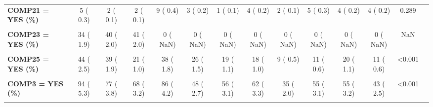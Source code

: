 \documentclass[
]{article}
\begin{document}
\begin{table}[H]
\begin{tabular}[t]{>{\raggedright\arraybackslash}p{5em}ccccccccccccc}
\textbf{COMP21 = YES (\%)} & 5 (  0.3) & 2 (  0.1) & 2 (  0.1) & 9 (  0.4) & 3 (  0.2) & 1 (  0.1) & 4 (  0.2) & 2 (  0.1) & 5 (  0.3) & 4 (  0.2) & 4 (  0.2) & 0.289 & \\
\textbf{\cellcolor{gray!10}{COMP22 = YES (\%)}} & \cellcolor{gray!10}{15 (  0.9)} & \cellcolor{gray!10}{16 (  0.8)} & \cellcolor{gray!10}{14 (  0.7)} & \cellcolor{gray!10}{12 (  0.6)} & \cellcolor{gray!10}{11 (  0.6)} & \cellcolor{gray!10}{9 (  0.5)} & \cellcolor{gray!10}{11 (  0.6)} & \cellcolor{gray!10}{9 (  0.5)} & \cellcolor{gray!10}{8 (  0.5)} & \cellcolor{gray!10}{6 (  0.3)} & \cellcolor{gray!10}{6 (  0.3)} & \cellcolor{gray!10}{0.592} & \cellcolor{gray!10}{}\\
\textbf{COMP23 = YES (\%)} & 34 (  1.9) & 40 (  2.0) & 41 (  2.0) & 0 (  NaN) & 0 (  NaN) & 0 (  NaN) & 0 (  NaN) & 0 (  NaN) & 0 (  NaN) & 0 (  NaN) & 0 (  NaN) & NaN & \\
\textbf{\cellcolor{gray!10}{COMP24 = YES (\%)}} & \cellcolor{gray!10}{139 (  7.9)} & \cellcolor{gray!10}{177 (  8.6)} & \cellcolor{gray!10}{142 (  6.8)} & \cellcolor{gray!10}{111 (  5.4)} & \cellcolor{gray!10}{77 (  4.4)} & \cellcolor{gray!10}{108 (  6.1)} & \cellcolor{gray!10}{86 (  4.6)} & \cellcolor{gray!10}{91 (  5.1)} & \cellcolor{gray!10}{87 (  4.9)} & \cellcolor{gray!10}{117 (  6.7)} & \cellcolor{gray!10}{71 (  4.4)} & \cellcolor{gray!10}{<0.001} & \cellcolor{gray!10}{}\\
\textbf{COMP25 = YES (\%)} & 44 (  2.5) & 39 (  1.9) & 21 (  1.0) & 38 (  1.8) & 26 (  1.5) & 19 (  1.1) & 18 (  1.0) & 9 (  0.5) & 11 (  0.6) & 20 (  1.1) & 11 (  0.6) & <0.001 & \\
\textbf{\cellcolor{gray!10}{COMP26 = YES (\%)}} & \cellcolor{gray!10}{238 ( 13.7)} & \cellcolor{gray!10}{137 (  6.7)} & \cellcolor{gray!10}{115 (  5.5)} & \cellcolor{gray!10}{129 (  6.2)} & \cellcolor{gray!10}{63 (  3.6)} & \cellcolor{gray!10}{35 (  2.0)} & \cellcolor{gray!10}{38 (  2.0)} & \cellcolor{gray!10}{23 (  1.3)} & \cellcolor{gray!10}{21 (  1.2)} & \cellcolor{gray!10}{22 (  1.3)} & \cellcolor{gray!10}{18 (  1.0)} & \cellcolor{gray!10}{<0.001} & \cellcolor{gray!10}{}\\
\textbf{COMP3 = YES (\%)} & 94 (  5.3) & 77 (  3.8) & 68 (  3.2) & 86 (  4.2) & 48 (  2.7) & 56 (  3.1) & 62 (  3.3) & 35 (  2.0) & 55 (  3.1) & 55 (  3.2) & 43 (  2.5) & <0.001 & \\
\textbf{\cellcolor{gray!10}{COMP4 = YES (\%)}} & \cellcolor{gray!10}{21 (  1.2)} & \cellcolor{gray!10}{20 (  1.0)} & \cellcolor{gray!10}{11 (  0.5)} & \cellcolor{gray!10}{22 (  1.1)} & \cellcolor{gray!10}{27 (  1.5)} & \cellcolor{gray!10}{42 (  2.4)} & \cellcolor{gray!10}{17 (  0.9)} & \cellcolor{gray!10}{32 (  1.8)} & \cellcolor{gray!10}{49 (  2.8)} & \cellcolor{gray!10}{39 (  2.3)} & \cellcolor{gray!10}{11 (  0.7)} & \cellcolor{gray!10}{<0.001} & \cellcolor{gray!10}{}\\

\end{tabular}
\end{table}
\end{document}
